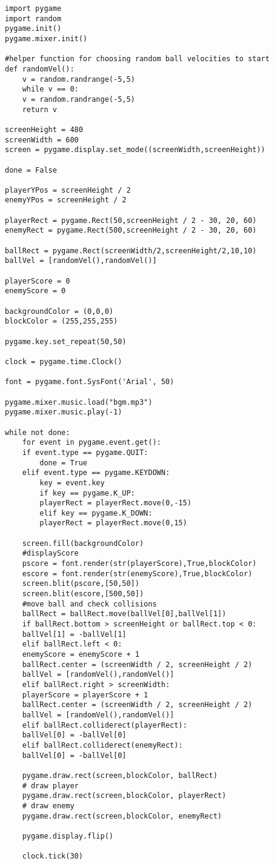 \documentclass[11pt]{article}
\begin{document}
\begin{verbatim}
import pygame
import random
pygame.init()
pygame.mixer.init()

#helper function for choosing random ball velocities to start
def randomVel():
    v = random.randrange(-5,5)
    while v == 0:
	v = random.randrange(-5,5)
    return v

screenHeight = 480
screenWidth = 600
screen = pygame.display.set_mode((screenWidth,screenHeight))

done = False

playerYPos = screenHeight / 2
enemyYPos = screenHeight / 2

playerRect = pygame.Rect(50,screenHeight / 2 - 30, 20, 60)
enemyRect = pygame.Rect(500,screenHeight / 2 - 30, 20, 60)

ballRect = pygame.Rect(screenWidth/2,screenHeight/2,10,10)
ballVel = [randomVel(),randomVel()]

playerScore = 0
enemyScore = 0

backgroundColor = (0,0,0)
blockColor = (255,255,255)

pygame.key.set_repeat(50,50)

clock = pygame.time.Clock()

font = pygame.font.SysFont('Arial', 50)

pygame.mixer.music.load("bgm.mp3")
pygame.mixer.music.play(-1)

while not done:
    for event in pygame.event.get():
	if event.type == pygame.QUIT:
	    done = True
	elif event.type == pygame.KEYDOWN:
	    key = event.key
	    if key == pygame.K_UP:
		playerRect = playerRect.move(0,-15)
	    elif key == pygame.K_DOWN:
		playerRect = playerRect.move(0,15)

    screen.fill(backgroundColor)
    #displayScore
    pscore = font.render(str(playerScore),True,blockColor)
    escore = font.render(str(enemyScore),True,blockColor)
    screen.blit(pscore,[50,50])
    screen.blit(escore,[500,50])
    #move ball and check collisions
    ballRect = ballRect.move(ballVel[0],ballVel[1])
    if ballRect.bottom > screenHeight or ballRect.top < 0:
	ballVel[1] = -ballVel[1]
    elif ballRect.left < 0:
	enemyScore = enemyScore + 1
	ballRect.center = (screenWidth / 2, screenHeight / 2)
	ballVel = [randomVel(),randomVel()]
    elif ballRect.right > screenWidth:
	playerScore = playerScore + 1
	ballRect.center = (screenWidth / 2, screenHeight / 2)
	ballVel = [randomVel(),randomVel()]
    elif ballRect.colliderect(playerRect):
	ballVel[0] = -ballVel[0]
    elif ballRect.colliderect(enemyRect):
	ballVel[0] = -ballVel[0]

    pygame.draw.rect(screen,blockColor, ballRect)
    # draw player
    pygame.draw.rect(screen,blockColor, playerRect)
    # draw enemy
    pygame.draw.rect(screen,blockColor, enemyRect)

    pygame.display.flip()

    clock.tick(30)
\end{verbatim}
\end{document}
